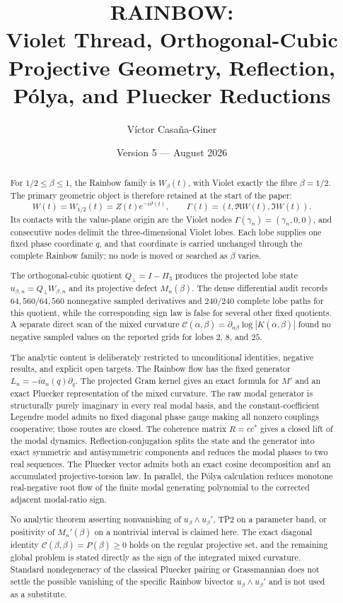 \documentclass[11pt]{amsart}
\title[RAINBOW V5]{RAINBOW:\\Violet Thread, Orthogonal-Cubic Projective Geometry, Reflection, P\'olya, and Pluecker Reductions}
\author{Víctor Casaña-Giner}
\date{Version 5 --- August 2026}
\numberwithin{equation}{section}
\theoremstyle{plain}
\theoremstyle{definition}
\theoremstyle{remark}
\begin{document}
\begin{abstract}
For $1/2\le\beta\le1$, the Rainbow family is $W_\beta(t)$, with Violet exactly the fibre $\beta=1/2$.  The primary geometric object is therefore retained at the start of the paper:
\[
W(t)=W_{1/2}(t)=Z(t)e^{-i\vartheta(t)},\qquad
\Gamma(t)=(t,\Re W(t),\Im W(t)).
\]
Its contacts with the value-plane origin are the Violet nodes $\Gamma(\gamma_n)=(\gamma_n,0,0)$, and consecutive nodes delimit the three-dimensional Violet lobes.  Each lobe supplies one fixed phase coordinate $q$, and that coordinate is carried unchanged through the complete Rainbow family; no node is moved or searched as $\beta$ varies.

The orthogonal-cubic quotient $Q_\perp=I-\Pi_3$ produces the projected lobe state $u_{\beta,n}=Q_\perp W_{\beta,n}$ and its projective defect $M_n(\beta)$.  The dense differential audit records $64{,}560/64{,}560$ nonnegative sampled derivatives and $240/240$ complete lobe paths for this quotient, while the corresponding sign law is false for several other fixed quotients.  A separate direct scan of the mixed curvature $\mathcal C(\alpha,\beta)=\partial_{\alpha\beta}\log|K(\alpha,\beta)|$ found no negative sampled values on the reported grids for lobes $2$, $8$, and $25$.

The analytic content is deliberately restricted to unconditional identities, negative results, and explicit open targets.  The Rainbow flow has the fixed generator $L_n=-ia_n(q)\partial_q$.  The projected Gram kernel gives an exact formula for $M'$ and an exact Pluecker representation of the mixed curvature.  The raw modal generator is structurally purely imaginary in every real modal basis, and the constant-coefficient Legendre model admits no fixed diagonal phase gauge making all nonzero couplings cooperative; those routes are closed.  The coherence matrix $R=cc^*$ gives a closed lift of the modal dynamics.  Reflection-conjugation splits the state and the generator into exact symmetric and antisymmetric components and reduces the modal phases to two real sequences.  The Pluecker vector admits both an exact cosine decomposition and an accumulated projective-torsion law.  In parallel, the P\'olya calculation reduces monotone real-negative root flow of the finite modal generating polynomial to the corrected adjacent modal-ratio sign.

No analytic theorem asserting nonvanishing of $u_\beta\wedge u_\beta'$, TP2 on a parameter band, or positivity of $M_n'(\beta)$ on a nontrivial interval is claimed here.  The exact diagonal identity $\mathcal C(\beta,\beta)=P(\beta)\ge0$ holds on the regular projective set, and the remaining global problem is stated directly as the sign of the integrated mixed curvature.  Standard nondegeneracy of the classical Pluecker pairing or Grassmannian does not settle the possible vanishing of the specific Rainbow bivector $u_\beta\wedge u_\beta'$ and is not used as a substitute.
\end{abstract}
\end{document}
